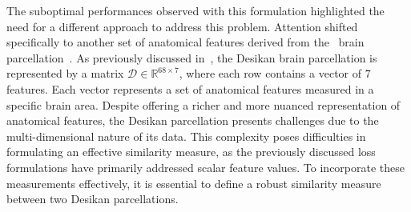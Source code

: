 The suboptimal performances observed with this formulation highlighted the need
for a different approach to address this problem. Attention shifted specifically
to another set of anatomical features derived from
the~\citeauthor{desikan_automated_2006} brain
parcellation~. As previously discussed
in~, the Desikan brain parcellation is represented
by a matrix $\mathcal{D} \in \mathbb{R}^{68 \times 7}$, where each row contains
a vector of $7$ features. Each vector represents a set of anatomical features
measured in a specific brain area. Despite offering a richer and more nuanced
representation of anatomical features, the Desikan parcellation presents
challenges due to the multi-dimensional nature of its data. This complexity
poses difficulties in formulating an effective similarity measure, as the
previously discussed loss formulations have primarily addressed scalar feature
values. To incorporate these measurements effectively, it is essential to define
a robust similarity measure between two Desikan parcellations.

